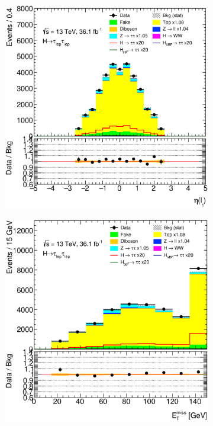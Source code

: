 \begin{figure}[htb]
\begin{subfigure}[t]{0.3\textwidth}
    \end{subfigure}
    \begin{subfigure}[t]{0.3\textwidth}
        \includegraphics[width=\textwidth]{./plots/mva/modeling/input_vars/BOOST_CR/ll-CutMVABoostedCatTopCR-LeptonEta0-lin.eps}
    \end{subfigure}
    \begin{subfigure}[t]{0.3\textwidth}
        \includegraphics[width=\textwidth]{./plots/mva/modeling/input_vars/BOOST_CR/ll-CutMVABoostedCatTopCR-MET-lin.eps}

\end{subfigure}
\end{figure}
